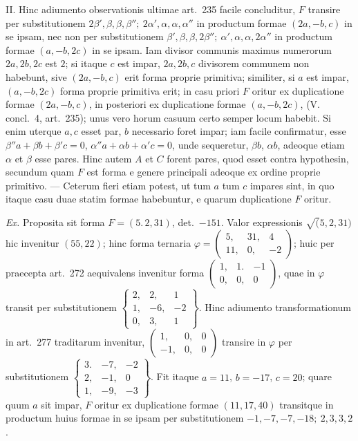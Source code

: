 II. Hinc adiumento observationis ultimae art.~235 facile concluditur, $F$ transire per substitutionem $2\beta',\allowbreak \beta,\allowbreak \beta,\allowbreak \beta'';\ 2\alpha',\allowbreak \alpha,\allowbreak \alpha,\allowbreak \alpha''$ in productum formae $(2a,-b,c)$ in se ipsam, nec non per substitutionem $\beta',\allowbreak \beta,\allowbreak \beta,\allowbreak 2\beta'';\ \alpha',\allowbreak \alpha,\allowbreak \alpha,\allowbreak 2\alpha''$ in productum formae $(a,-b,2c)$ in se ipsam. Iam divisor communis maximus numerorum $2a,2b,2c$ est $2$; si itaque $c$ est impar, $2a,2b,c$ divisorem communem non habebunt, sive $(2a,-b,c)$ erit forma proprie primitiva; similiter, si $a$ est impar, $(a,-b,2c)$ forma proprie primitiva erit; in casu priori $F$ oritur ex duplicatione formae $(2a,-b,c)$, in posteriori ex duplicatione formae $(a,-b,2c)$, (V. concl.~4, art.~235); unus vero horum casuum certo semper locum habebit. Si enim uterque $a,c$ esset par, $b$ necessario foret impar; iam facile confirmatur, esse $\beta''a+\beta b+\beta'c=0$, $\alpha''a+\alpha b+\alpha'c=0$, unde sequeretur, $\beta b$, $\alpha b$, adeoque etiam $\alpha$ et $\beta$ esse pares. Hinc autem $A$ et $C$ forent pares, quod esset contra hypothesin, secundum quam $F$ est forma e genere principali adeoque ex ordine proprie primitivo. --- Ceterum fieri etiam potest, ut tum $a$ tum $c$ impares sint, in quo itaque casu duae statim formae habebuntur, e quarum duplicatione $F$ oritur.

\textit{Ex.} Proposita sit forma $F=(5.\,2,31)$, det.~$-151$. Valor expressionis $\surd(5,2,31)$ hic invenitur $(55,22)$; hinc forma ternaria $\varphi=\left(\begin{smallmatrix}5,&31,&4\\11,&0,&-2\end{smallmatrix}\right)$; huic per praecepta art.~272 aequivalens invenitur forma $\left(\begin{smallmatrix}1,&1.&-1\\0,&0,&0\end{smallmatrix}\right)$, quae in $\varphi$ transit per substitutionem $\left\{\begin{smallmatrix}2,&2,&1\\1,&-6,&-2\\0,&3,&1\end{smallmatrix}\right\}$. Hinc adiumento transformationum in art.~277 traditarum invenitur, $\left(\begin{smallmatrix}1,&0,&0\\-1,&0,&0\end{smallmatrix}\right)$ transire in $\varphi$ per substitutionem $\left\{\begin{smallmatrix}3.&-7,&-2\\2,&-1,&0\\1,&-9,&-3\end{smallmatrix}\right\}$. Fit itaque $a=11$, $b=-17$, $c=20$; quare quum $a$ sit impar, $F$ oritur ex duplicatione formae $(11,17,40)$ transitque in productum huius formae in se ipsam per substitutionem $-1,-7,-7,-18;\ 2,3,3,2$.

